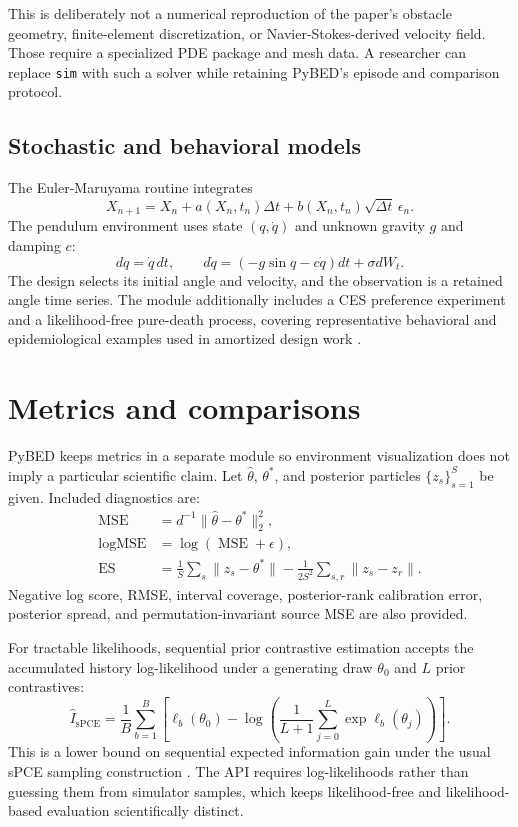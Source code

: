 \documentclass[11pt]{article}
\begin{document}
This is deliberately not a numerical reproduction of the paper's obstacle geometry,
finite-element discretization, or Navier-Stokes-derived velocity field. Those require
a specialized PDE package and mesh data. A researcher can replace \texttt{sim} with
such a solver while retaining PyBED's episode and comparison protocol.

\subsection{Stochastic and behavioral models}

The Euler-Maruyama routine integrates
\begin{equation}
 X_{n+1}=X_n+a(X_n,t_n)\Delta t+b(X_n,t_n)\sqrt{\Delta t}\,\epsilon_n.
\end{equation}
The pendulum environment uses state $(q,\dot q)$ and unknown gravity $g$ and damping
$c$:
\begin{equation}
 dq=\dot q\,dt,\qquad
 d\dot q=(-g\sin q-c\dot q)dt+\sigma dW_t.
\end{equation}
The design selects its initial angle and velocity, and the observation is a retained
angle time series. The module additionally includes a CES preference experiment and
a likelihood-free pure-death process, covering representative behavioral and
epidemiological examples used in amortized design work
\cite{foster2021dad,ivanova2021idad}.

\section{Metrics and comparisons}

PyBED keeps metrics in a separate module so environment visualization does not imply a
particular scientific claim. Let $\hat\theta$, $\theta^*$, and posterior particles
$\{z_s\}_{s=1}^{S}$ be given. Included diagnostics are:
\begin{align}
 \operatorname{MSE} &= d^{-1}\lVert\hat\theta-\theta^*\rVert_2^2,\\
 \operatorname{logMSE} &= \log(\operatorname{MSE}+\epsilon),\\
 \operatorname{ES} &= \frac{1}{S}\sum_s\lVert z_s-\theta^*\rVert
 -\frac{1}{2S^2}\sum_{s,r}\lVert z_s-z_r\rVert.
\end{align}
Negative log score, RMSE, interval coverage, posterior-rank calibration error,
posterior spread, and permutation-invariant source MSE are also provided.

For tractable likelihoods, sequential prior contrastive estimation accepts the
accumulated history log-likelihood under a generating draw $\theta_0$ and $L$ prior
contrastives:
\begin{equation}
 \widehat I_{\mathrm{sPCE}} =
 \frac{1}{B}\sum_{b=1}^{B}\left[
 \ell_b(\theta_0)-\log\left(
 \frac{1}{L+1}\sum_{j=0}^{L}\exp\ell_b(\theta_j)
 \right)\right].
\end{equation}
This is a lower bound on sequential expected information gain under the usual sPCE
sampling construction \cite{foster2021dad}. The API requires log-likelihoods rather
than guessing them from simulator samples, which keeps likelihood-free and
likelihood-based evaluation scientifically distinct.
\end{document}
